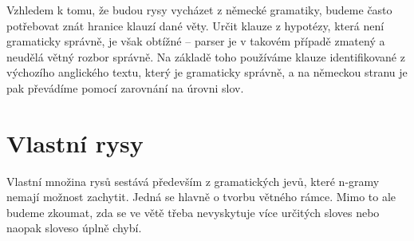 \documentclass[12pt,a4paper]{report}
\begin{document}
Vzhledem k tomu, že budou rysy vycházet z německé gramatiky, budeme často potřebovat znát hranice klauzí dané věty. Určit klauze z hypotézy, která není gramaticky správně, je však obtížné -- parser je v takovém případě zmatený a neudělá větný rozbor správně. Na základě toho používáme klauze identifikované z výchozího anglického textu, který je gramaticky správně, a na německou stranu je pak převádíme pomocí zarovnání na úrovni slov. 

\section{Vlastní rysy}
Vlastní množina rysů sestává především z gramatických jevů, které n-gramy nemají možnost zachytit. Jedná se hlavně o tvorbu větného rámce. Mimo to ale budeme zkoumat, zda se ve větě třeba nevyskytuje více určitých sloves nebo naopak sloveso úplně chybí.
\end{document}
